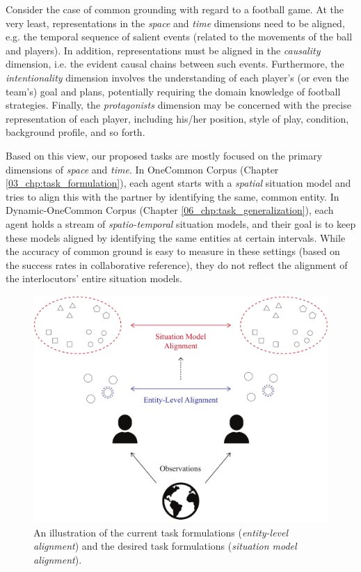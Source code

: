 Consider the case of common grounding with regard to a football game. At the very least, representations in the \textit{space} and \textit{time} dimensions need to be aligned, e.g. the temporal sequence of salient events (related to the movements of the ball and players). In addition, representations must be aligned in the \textit{causality} dimension, i.e. the evident causal chains between such events. Furthermore, the \textit{intentionality} dimension involves the understanding of each player's (or even the team's) goal and plans, potentially requiring the domain knowledge of football strategies. Finally, the \textit{protagonists} dimension may be concerned with the precise representation of each player, including his/her position, style of play, condition, background profile, and so forth.

Based on this view, our proposed tasks are mostly focused on the primary dimensions of \textit{space} and \textit{time}. In OneCommon Corpus (Chapter \ref{03_chp:task_formulation}), each agent starts with a \textit{spatial} situation model and tries to align this with the partner by identifying the same, common entity. In Dynamic-OneCommon Corpus (Chapter \ref{06_chp:task_generalization}), each agent holds a stream of \textit{spatio-temporal} situation models, and their goal is to keep these models aligned by identifying the same entities at certain intervals. While the accuracy of common ground is easy to measure in these settings (based on the success rates in collaborative reference), they do not reflect the alignment of the interlocutors' entire situation models.

\begin{figure}[t!]
\centering
\includegraphics[width=\textwidth]{situation_models.pdf}
\caption{An illustration of the current task formulations (\textit{entity-level alignment}) and the desired task formulations (\textit{situation model alignment}).
}
\label{07_fig:situation_model_alignment}
\end{figure}


